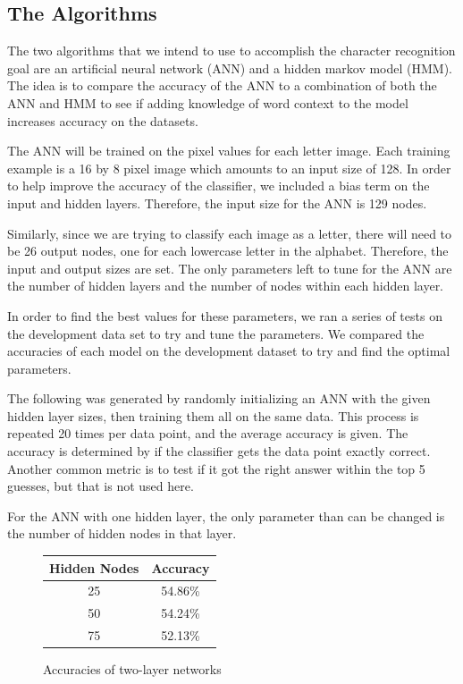 \documentclass[11pt,a4paper,twocolumn]{article}
\begin{document}
\subsection*{The Algorithms}

The two algorithms that we intend to use to accomplish the character recognition goal are an artificial neural network (ANN) and a hidden markov model (HMM). The idea is to compare the accuracy of the ANN to a combination of both the ANN and HMM to see if adding knowledge of word context to the model increases accuracy on the datasets.

The ANN will be trained on the pixel values for each letter image. Each training example is a 16 by 8 pixel image which amounts to an input size of 128. In order to help improve the accuracy of the classifier, we included a bias term on the input and hidden layers. Therefore, the input size for the ANN is 129 nodes.

Similarly, since we are trying to classify each image as a letter, there will need to be 26 output nodes, one for each lowercase letter in the alphabet. Therefore, the input and output sizes are set. The only parameters left to tune for the ANN are the number of hidden layers and the number of nodes within each hidden layer.

In order to find the best values for these parameters, we ran a series of tests on the development data set to try and tune the parameters. We compared the accuracies of each model on the development dataset to try and find the optimal parameters.

The following was generated by randomly initializing an ANN with the given hidden layer sizes, then training them all on the same data. This process is repeated 20 times per data point, and the average accuracy is given. The accuracy is determined by if the classifier gets the data point exactly correct. Another common metric is to test if it got the right answer within the top 5 guesses, but that is not used here.

For the ANN with one hidden layer, the only parameter than can be changed is the number of hidden nodes in that layer.
\begin{figure}[h]
\caption{Accuracies of two-layer networks}
\centering
\begin{tabular}{|c|c|}
\hline 
Hidden Nodes & Accuracy \\ 
\hline 
25 & 54.86\% \\ 
\hline 
50 & 54.24\% \\ 
\hline 
75 & 52.13\% \\ 
\hline 
\end{tabular} 
\end{figure}
\end{document}
